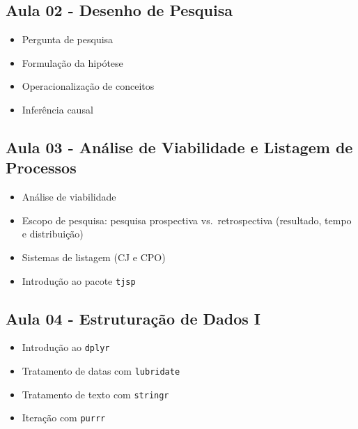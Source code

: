 \documentclass[
  letterpaper,
  DIV=11,
  numbers=noendperiod]{scrreprt}
\providecommand{\tightlist}{%
  \setlength{\itemsep}{0pt}\setlength{\parskip}{0pt}}
\begin{document}
\subsection{Aula 02 - Desenho de
Pesquisa}\label{aula-02---desenho-de-pesquisa}

\begin{itemize}
\tightlist
\item
  Pergunta de pesquisa\\
\item
  Formulação da hipótese\\
\item
  Operacionalização de conceitos\\
\item
  Inferência causal
\end{itemize}

\subsection{Aula 03 - Análise de Viabilidade e Listagem de
Processos}\label{aula-03---anuxe1lise-de-viabilidade-e-listagem-de-processos}

\begin{itemize}
\tightlist
\item
  Análise de viabilidade\\
\item
  Escopo de pesquisa: pesquisa prospectiva vs.~retrospectiva (resultado,
  tempo e distribuição)\\
\item
  Sistemas de listagem (CJ e CPO)\\
\item
  Introdução ao pacote \texttt{tjsp}
\end{itemize}

\subsection{Aula 04 - Estruturação de Dados
I}\label{aula-04---estruturauxe7uxe3o-de-dados-i}

\begin{itemize}
\tightlist
\item
  Introdução ao \texttt{dplyr}\\
\item
  Tratamento de datas com \texttt{lubridate}\\
\item
  Tratamento de texto com \texttt{stringr}\\
\item
  Iteração com \texttt{purrr}
\end{itemize}
\end{document}
